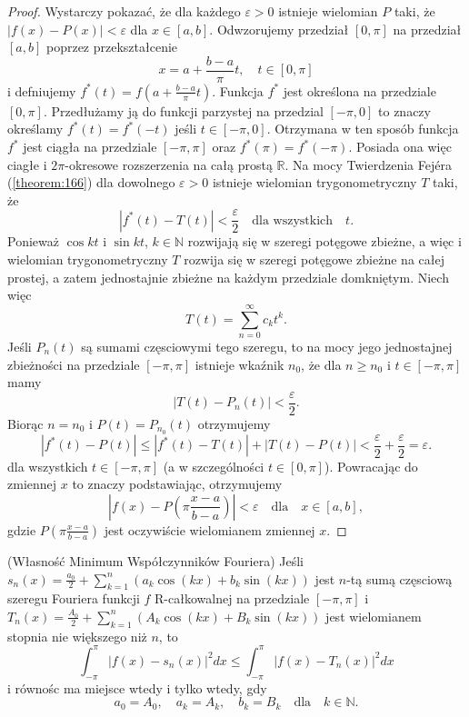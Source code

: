 \documentclass[leqno]{article}
\begin{document}
\begin{justify}
\begin{proof}
    Wystarczy pokazać, że dla każdego $\varepsilon > 0$ istnieje wielomian $P$ taki, że $|f(x) 
    - P(x)| < \varepsilon$ dla $x \in [a,b]$. Odwzorujemy przedział $[0, \pi]$ na przedział $
    [a,b]$ poprzez przekształcenie
    \[
        x = a + \frac{b-a}{\pi}t, \quad t \in [0, \pi]
    \]
    i defniujemy $f^*(t) = f(a + \frac{b-a}{\pi}t)$. Funkcja $f^*$ jest określona na 
    przedziale $[0, \pi]$. Przedłużamy ją do funkcji parzystej na przedzial $[-\pi, 0]$ to 
    znaczy określamy $f^*(t) = f^*(-t)$ jeśli $t \in [-\pi, 0]$. Otrzymana w ten sposób funkcja $f^*$ jest ciągła na przedziale $[-\pi, \pi]$ oraz $f^*(\pi) = f^*(-\pi)$. Posiada ona więc ciagłe i $2\pi$-okresowe rozszerzenia na całą prostą $\mathbb{R}$. 
    Na mocy Twierdzenia Fejéra (\ref{theorem:166}) dla dowolnego $\varepsilon > 0$ istnieje wielomian trygonometryczny $T$ taki, że 
    \[
        |f^*(t) - T(t)| < \frac{\varepsilon}{2} \quad \text{dla wszystkich} \quad t.
    \]
    Ponieważ $\cos kt$ i $\sin kt$, $k \in \mathbb{N}$ rozwijają się w szeregi potęgowe zbieżne, a więc i wielomian trygonometryczny $T$ rozwija się w szeregi potęgowe zbieżne na całej prostej, a zatem jednostajnie zbieżne na każdym przedziale domkniętym. Niech więc
    \[
        T(t) = \sum_{n=0}^{\infty}c_k t^k.
    \]
    Jeśli $P_n(t)$ są sumami częsciowymi tego szeregu, to na mocy jego jednostajnej zbieżności na przedziale $[-\pi, \pi]$ istnieje wkaźnik $n_0$, że dla $n \geqslant n_0$ i $t \in [-\pi, \pi]$ mamy
    \[
        |T(t) - P_n(t)| < \frac{\varepsilon}{2}.
    \]
    Biorąc $n = n_0$ i $P(t) = P_{n_0}(t)$ otrzymujemy
    \[
        |f^*(t) - P(t)| \leqslant |f^*(t) - T(t)| + |T(t) - P(t)| < \frac{\varepsilon}{2} + \frac{\varepsilon}{2} = \varepsilon.
    \]
    dla wszystkich $t \in [-\pi, \pi]$ (a w szczególności $t \in [0, \pi]$). Powracając do zmiennej $x$ to znaczy podstawiając, otrzymujemy 
    \[
        |f(x) - P(\pi\frac{x-a}{b-a})| < \varepsilon \quad \text{dla} \quad x \in [a,b],
    \]
    gdzie $P(\pi\frac{x-a}{b-a})$ jest oczywiście wielomianem zmiennej $x$. 
\end{proof}

\begin{theorem}
{
    (Własność Minimum Współczynników Fouriera) Jeśli $s_n(x) = \frac{a_0}{2} + \sum_{k=1}^{n}(a_k \cos(kx) + b_k \sin (kx))$ jest $n$-tą sumą
    częsciową szeregu Fouriera funkcji $f$ R-całkowalnej na przedziale $[-\pi, \pi]$ i 
    $T_n(x) = \frac{A_0}{2} + \sum_{k=1}^{n}(A_k \cos(kx) + B_k \sin(kx))$ jest wielomianem stopnia nie większego niż $n$, to
    \[
        \int_{-\pi}^{\pi}{|f(x) - s_n(x)|}^2 dx \leqslant \int_{-\pi}^{\pi}{|f(x) - T_n(x)|}^2dx
    \]
    i równośc ma miejsce wtedy i tylko wtedy, gdy
    \[
        a_0 = A_0, \quad a_k = A_k, \quad b_k = B_k \quad \text{dla} \quad k \in \mathbb{N}.
    \]
}
\end{theorem}


\end{justify}
\end{document}
